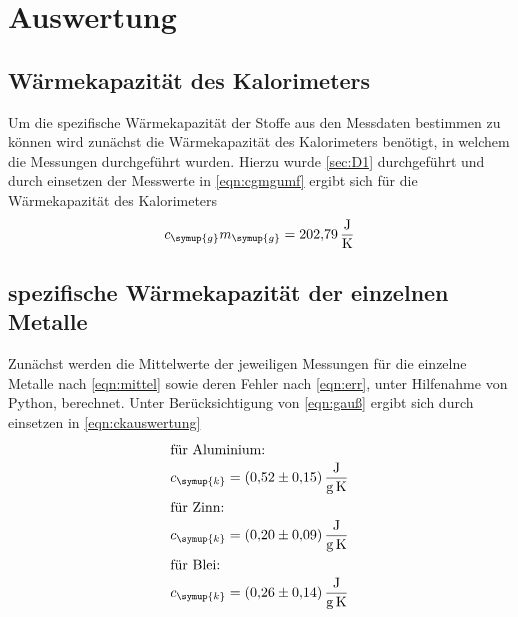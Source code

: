 \section{Auswertung}
\label{sec:Auswertung}
\subsection{Wärmekapazität des Kalorimeters}
Um die spezifische Wärmekapazität der Stoffe aus den Messdaten bestimmen
zu können wird zunächst die Wärmekapazität des Kalorimeters benötigt,
in welchem die Messungen durchgeführt wurden. Hierzu wurde \ref{sec:D1}
durchgeführt und
durch einsetzen der Messwerte in \eqref{eqn:cgmgumf} ergibt sich für die Wärmekapazität des
Kalorimeters
\begin{equation*}
  c_\symup{g}m_\symup{g} = \SI{202,79}{\joule\per\kelvin}
\end{equation*}

\subsection{spezifische Wärmekapazität der einzelnen Metalle}
Zunächst werden die Mittelwerte der jeweiligen Messungen für die
einzelne Metalle nach \eqref{eqn:mittel} sowie deren Fehler nach \eqref{eqn:err}, unter Hilfenahme von
Python, berechnet.
Unter Berücksichtigung von \eqref{eqn:gauß} ergibt sich durch einsetzen
in \eqref{eqn:ckauswertung}
\begin{gather*}
  \intertext{für Aluminium:}
  c_\symup{k} =\SI{0,52(15)}{\joule\per\gram\per\kelvin}\\
  \intertext{für Zinn:}
  c_\symup{k} =\SI{0,20(9)}{\joule\per\gram\per\kelvin}\\
  \intertext{für Blei:}
  c_\symup{k} =\SI{0,26(14)}{\joule\per\gram\per\kelvin}
\end{gather*}


